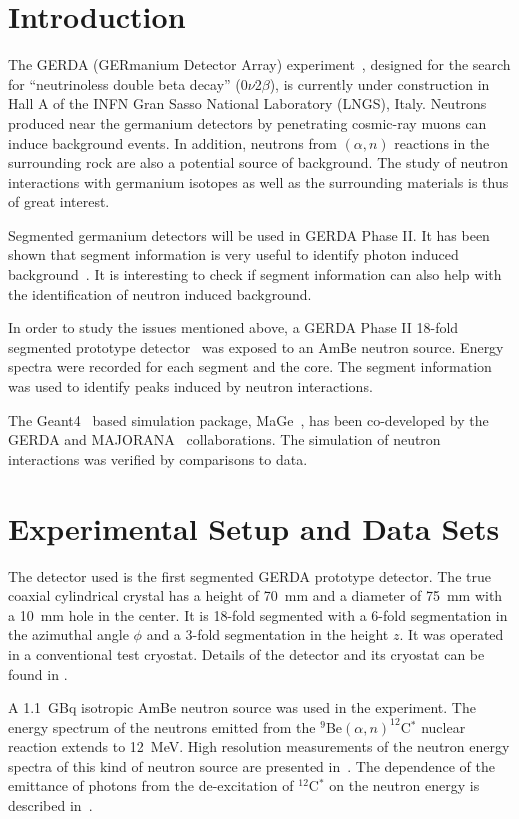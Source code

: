 \documentclass{elsart}
\begin{document}
\section{Introduction}
\label{sec:int}
The GERDA (GERmanium Detector Array) experiment~\cite{gerda}, designed
for the search for ``neutrinoless double beta decay''
(0$\nu$2$\beta$), is currently under construction in Hall A of the
INFN Gran Sasso National Laboratory (LNGS), Italy. Neutrons produced
near the germanium detectors by penetrating cosmic-ray muons can
induce background events. In addition, neutrons from $(\alpha, n)$
reactions in the surrounding rock are also a potential source of
background. The study of neutron interactions with germanium isotopes
as well as the surrounding materials is thus of great interest.

Segmented germanium detectors will be used in GERDA Phase II. It has
been shown that segment information is very useful to identify photon
induced background~\cite{pid}. It is interesting to check if segment
information can also help with the identification of neutron induced
background.

In order to study the issues mentioned above, a GERDA Phase II 18-fold
segmented prototype detector~\cite{siegfried} was exposed to an AmBe
neutron source. Energy spectra were recorded for each segment and the
core. The segment information was used to identify peaks induced by
neutron interactions.

The Geant4~\cite{g1,g2} based simulation package, MaGe~\cite{mage},
has been co-developed by the GERDA and MAJORANA~\cite{major}
collaborations. The simulation of neutron interactions was verified by
comparisons to data.


\section{Experimental Setup and Data Sets}
\label{sec:exp}
The detector used is the first segmented GERDA prototype detector. The
true coaxial cylindrical crystal has a height of 70~mm and a diameter
of 75~mm with a 10~mm hole in the center. It is 18-fold segmented with
a 6-fold segmentation in the azimuthal angle $\phi$ and a 3-fold
segmentation in the height $z$. It was operated in a conventional test
cryostat. Details of the detector and its cryostat can be found in
\cite{siegfried}.

A 1.1~GBq isotropic AmBe neutron source was used in the
experiment. The energy spectrum of the neutrons emitted from the
$^{9}$Be$(\alpha,n)^{12}$C$^{*}$ nuclear reaction extends to
12~MeV. High resolution measurements of the neutron energy spectra of
this kind of neutron source are presented in~\cite{amben, geiger}. The
dependence of the emittance of photons from the de-excitation of
$^{12}$C$^{*}$ on the neutron energy is described in~\cite{geiger}.
\end{document}
